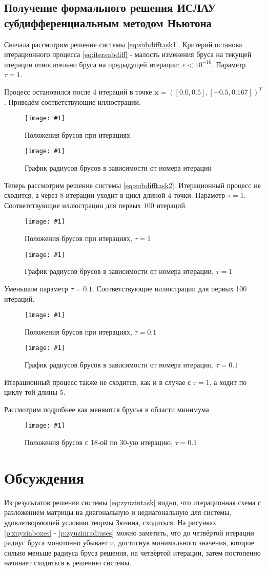 \documentclass[a4paper,12pt]{article}
\newcommand{\plot}[3]{
    \begin{figure}[H]
        \texttt{[image: \#1]}
        \caption{#2}
        \label{#3}
    \end{figure}
}
\begin{document}
    \subsection{Получение формального решения ИСЛАУ субдифференциальным методом Ньютона}
    Сначала рассмотрим решение системы \ref{eq:subdifftask1}. \newline
    Критерий останова итерационного процесса \ref{eq:itersubdiff} - малость изменения бруса на текущей итерации относительно бруса на предыдущей итерации: $ \varepsilon < 10^{-16} $.
    Параметр $ \tau = 1 $.

    \noindent Процесс остановился после $ 4 $ итераций в точке $ \textbf{x} = ([0.0, 0.5], [-0.5, 0.167])^{T} $. \newline
    Приведём соответствующие иллюстрации.
    \plot{SubdifferentialNewtonTask1Boxes}{Положения брусов при итерациях}{p:subdifftask1boxes}
    \plot{SubdifferentialNewtonTask1Radiuses}{График радиусов брусов в зависимости от номера итерации}{p:subdifftask2radiuses}

    \noindent
    Теперь рассмотрим решение системы \ref{eq:subdifftask2}. \newline
    Итерационный процесс не сходится, а через $ 8 $ итерации уходит в цикл длиной $ 4 $ точки. 
    Параметр $ \tau = 1 $.
    Соответствующие иллюстрации для первых $ 100 $ итераций.
    \plot{SubdifferentialNewtonTask2Tau1Boxes}{Положения брусов при итерациях, $ \tau = 1 $}{p:subdifftask2tau1boxes}
    \plot{SubdifferentialNewtonTask2Tau1Radiuses}{График радиусов брусов в зависимости от номера итерации, $ \tau = 1 $}{p:subdifftask2tau1radiuses}

    \noindent
    Уменьшим параметр $ \tau = 0.1 $.
    Соответствующие иллюстрации для первых 100 итераций.
    \plot{SubdifferentialNewtonTask2Tau01Boxes}{Положения брусов при итерациях, $ \tau = 0.1 $}{p:subdifftask2tau01boxes}
    \plot{SubdifferentialNewtonTask2Tau01Radiuses}{График радиусов брусов в зависимости от номера итерации, $ \tau = 0.1 $}{p:subdifftask2tau01radiuses}
    Итерационный процесс также не сходится, как и в случае с $ \tau = 1 $, а ходит по циклу той длины $ 5 $.
    
    Рассмотрим подробнее как меняются брусья в области минимума
	\plot{SubdifferentialNewtonBoxes_18_30_шеукы}{Положения брусов с 18-ой по 30-ую итерацию, $ \tau = 0.1 $}{p:subdifftask2tau01radiuses}

    \section{Обсуждения}
    Из результатов решения системы \ref{eq:zyuzintask} видно, что итерационная схема с разложением матрицы на диагональную и недиагональную для системы, удовлетворяющей условию теормы Зюзина, сходиться.
    На рисунках \ref{p:zuyzinboxes} - \ref{p:zyuzinradiuses} можно заметить, что до четвёртой итерации радиус бруса монотонно убывает и, достигнув минимального значения, 
    которое сильно меньше радиуса бруса решения, на четвёртой итерации, затем постопенно начинает сходиться к решению системы. \newline
\end{document}
